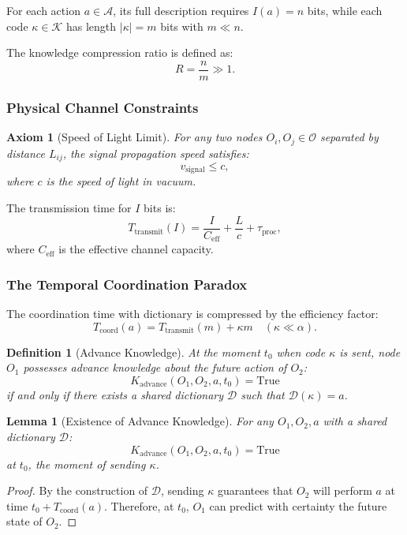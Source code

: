 \documentclass[11pt,a4paper]{article}
\newtheorem{lemma}{Lemma}
\newtheorem{axiom}{Axiom}
\newtheorem{definition}{Definition}
\begin{document}
For each action $a \in \mathcal{A}$, its full description requires $I(a) = n$ bits, while each code $\kappa \in \mathcal{K}$ has length $|\kappa| = m$ bits with $m \ll n$.

The knowledge compression ratio is defined as:
\[
R = \frac{n}{m} \gg 1.
\]

\subsubsection{Physical Channel Constraints}

\begin{axiom}[Speed of Light Limit]
	For any two nodes $O_i, O_j \in \mathcal{O}$ separated by distance $L_{ij}$, the signal propagation speed satisfies:
	\[
	v_{\text{signal}} \leq c,
	\]
	where $c$ is the speed of light in vacuum.
\end{axiom}

The transmission time for $I$ bits is:
\[
T_{\text{transmit}}(I) = \frac{I}{C_{\text{eff}}} + \frac{L}{c} + \tau_{\text{proc}},
\]
where $C_{\text{eff}}$ is the effective channel capacity.

\subsubsection{The Temporal Coordination Paradox}

The coordination time with dictionary is compressed by the efficiency factor:
\[
T_{\text{coord}}(a) = T_{\text{transmit}}(m) + \kappa m \quad (\kappa \ll \alpha).
\]

\begin{definition}[Advance Knowledge]
	At the moment $t_0$ when code $\kappa$ is sent, node $O_1$ possesses advance knowledge about the future action of $O_2$:
	\[
	K_{\text{advance}}(O_1, O_2, a, t_0) = \text{True}
	\]
	if and only if there exists a shared dictionary $\mathcal{D}$ such that $\mathcal{D}(\kappa) = a$.
\end{definition}

\begin{lemma}[Existence of Advance Knowledge]
	\label{lem:advance-knowledge}
	For any $O_1, O_2, a$ with a shared dictionary $\mathcal{D}$:
	\[
	K_{\text{advance}}(O_1, O_2, a, t_0) = \text{True}
	\]
	at $t_0$, the moment of sending $\kappa$.
\end{lemma}

\begin{proof}
	By the construction of $\mathcal{D}$, sending $\kappa$ guarantees that $O_2$ will perform $a$ at time $t_0 + T_{\text{coord}}(a)$. Therefore, at $t_0$, $O_1$ can predict with certainty the future state of $O_2$.
\end{proof}
\end{document}
